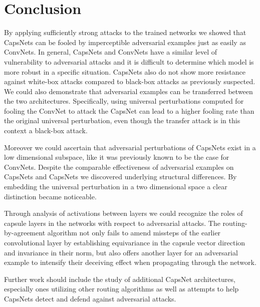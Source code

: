 
\section{Conclusion}
\label{sec:conclusion}

By applying sufficiently strong attacks to the trained networks we showed that CapsNets can be fooled by imperceptible adversarial examples just as easily as ConvNets. In general, CapsNets and ConvNets have a similar level of vulnerability to adversarial attacks and it is difficult to determine which model is more robust in a specific situation.
CapsNets also do not show more resistance against white-box attacks compared to black-box attacks as previously suspected.
We could also demonstrate that adversarial examples can be transferred between the two architectures.
Specifically, using universal perturbations computed for fooling the ConvNet to attack the CapsNet can lead to a higher fooling rate than the original universal perturbation, even though the transfer attack is in this context a black-box attack.

Moreover we could ascertain that adversarial perturbations of CapsNets exist in a low dimensional subspace, like it was previously known to be the case for ConvNets.
Despite the comparable effectiveness of adversarial examples on CapsNets and CapsNets we discovered underlying structural differences.
By embedding the universal perturbation in a two dimensional space a clear distinction became noticeable.

Through analysis of activations between layers we could recognize the roles of capsule layers in the networks with respect to adversarial attacks. The routing-by-agreement algorithm not only fails to amend missteps of the earlier convolutional layer by establishing equivariance in the capsule vector direction and invariance in their norm, but also offers another layer for an adversarial example to intensify their deceiving effect when propagating through the network.

Further work should include the study of additional CapsNet architectures, especially ones utilizing other routing algorithms as well as attempts to help CapsNets detect and defend against adversarial attacks.